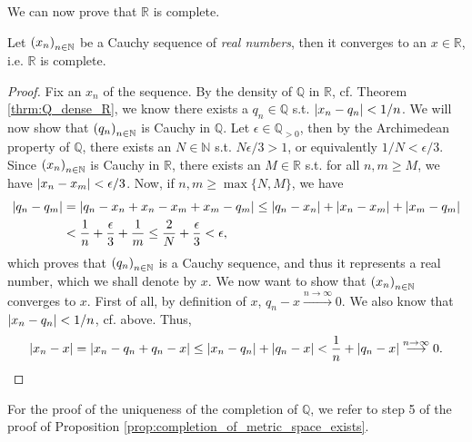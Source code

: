 We can now prove that $\mathbb R$ is complete.

\begin{proposition}\label{prop:R_is_complete}
	Let $\seq[x_n]$ be a Cauchy sequence of \textit{real numbers}, then it converges to an $x\in\mathbb R$, i.e. $\mathbb R$ is complete.
\end{proposition}

\begin{proof}
	Fix an $x_n$ of the sequence. By the density of $\mathbb Q$ in $\mathbb R$, cf. Theorem \ref{thrm:Q_dense_R}, we know there exists a $q_n\in\mathbb Q$ s.t. $\abs{x_n - q_n} < 1/n$. We will now show that $\seq[q_n]$ is Cauchy in $\mathbb Q$. Let $\epsilon\in\mathbb Q_{> 0}$, then by the Archimedean property of $\mathbb Q$, there exists an $N\in\mathbb N$ s.t. $N\epsilon/3 > 1$, or equivalently $1/N < \epsilon/3$. Since $\seq[x_n]$ is Cauchy in $\mathbb R$, there exists an $M\in\mathbb R$ s.t. for all $n, m\geq M$, we have $\abs{x_n - x_m} < \epsilon/3$. Now, if $n, m\geq \max\{N, M\}$, we have 
	\begin{align*}
		\abs{q_n - q_m} &= \abs{q_n -x_n + x_n - x_m + x_m - q_m } \leq \abs{q_n - x_n} + \abs{x_n - x_m} + \abs{x_m - q_m} 
		\\  &< \frac{1}{n} + \frac{\epsilon}{3} + \frac{1}{m} \leq \frac{2}{N} + \frac{\epsilon}{3} < \epsilon,
	\end{align*}
	which proves that $\seq[q_n]$ is a Cauchy sequence, and thus it represents a real number, which we shall denote by $x$. We now want to show that $\seq[x_n]$ converges to $x$. First of all, by definition of $x$, $q_n - x\overset{n\to\infty}{\longrightarrow} 0$. We also know that $\abs{x_n - q_n} < 1/n$, cf. above. Thus, 
	\begin{align*}
		\abs{x_n - x} = \abs{x_n - q_n + q_n - x} \leq \abs{x_n - q_n} + \abs{q_n - x} < \frac{1}{n} + \abs{q_n - x}\overset{n\to\infty}{\longrightarrow} 0.
	\end{align*}
\end{proof}

\begin{remark}
	For the proof of the uniqueness of the completion of $\mathbb Q$, we refer to step 5 of the proof of Proposition \ref{prop:completion_of_metric_space_exists}.
\end{remark}

